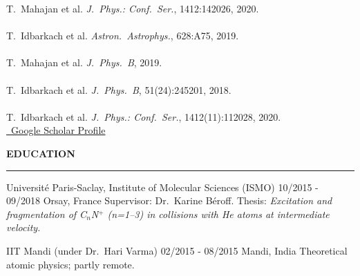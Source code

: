 \documentclass{thejus_cv}
\begin{document}
\begin{paracol}{2}



{\small
T.~Mahajan et al. \textit{J.~Phys.: Conf.~Ser.}, 1412:142026, 2020.\\[0.15cm]
{\color{cvlightgray}\hdashrule{\linewidth}{0.5pt}{1mm}}\\[0.15cm]
T.~Idbarkach et al. \textit{Astron.~Astrophys.}, 628:A75, 2019.\\[0.15cm]
{\color{cvlightgray}\hdashrule{\linewidth}{0.5pt}{1mm}}\\[0.15cm]
T.~Mahajan et al. \textit{J.~Phys.~B}, 2019.\\[0.15cm]
{\color{cvlightgray}\hdashrule{\linewidth}{0.5pt}{1mm}}\\[0.15cm]
T.~Idbarkach et al. \textit{J.~Phys.~B}, 51(24):245201, 2018.\\[0.15cm]
{\color{cvlightgray}\hdashrule{\linewidth}{0.5pt}{1mm}}\\[0.15cm]
T.~Idbarkach et al. \textit{J.~Phys.: Conf.~Ser.}, 1412(11):112028, 2020.
}\\[0.1cm]
\href{https://scholar.google.com/citations?user=PJkZwAwAAAAJ}{\faGraduationCap\ Google Scholar Profile}



\end{paracol}

\begin{center}
    \vspace{0.1em}
    {\Large\textbf{EDUCATION}}\\
    {\color{cvtext}\rule{0.5\linewidth}{1.5pt}}\par
    \vspace{0.3em}
\end{center}

\begin{minipage}[t]{0.48\textwidth}
             {Universit\'e Paris-Saclay, Institute of Molecular Sciences (ISMO)}
             {10/2015 - 09/2018}
             {Orsay, France}
             {{\small Supervisor: Dr.~Karine B\'eroff. Thesis: \textit{Excitation and fragmentation of C$_n$N$^+$ (n=1--3) in collisions with He atoms at intermediate velocity.}}}
\end{minipage}%
\hfill
\begin{minipage}[t]{0.48\textwidth}
             {IIT Mandi (under Dr.~Hari Varma)}
             {02/2015 - 08/2015}
             {Mandi, India}
             {{\small Theoretical atomic physics; partly remote.}}
\end{minipage}
\end{document}

